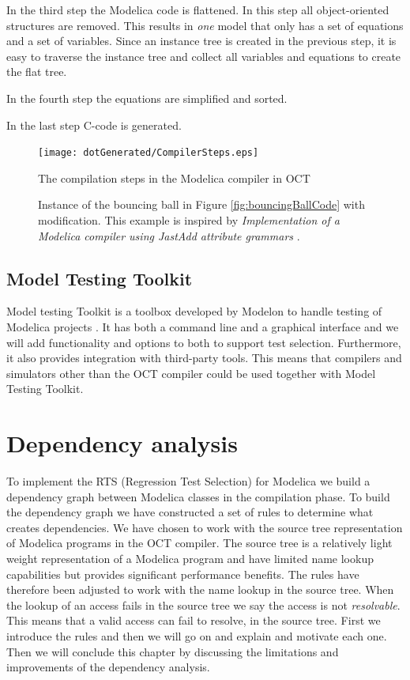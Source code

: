 \documentclass{cslthse-msc}
\begin{document}
In the third step the Modelica code is flattened. In this step all object-oriented structures are removed. This results in \emph{one} model that only has a set of equations and a set of variables. Since an instance tree is created in the previous step, it is easy to traverse the instance tree and collect all variables and equations to create the flat tree.

In the fourth step the equations are simplified and sorted.

In the last step C-code is generated. 

\begin{figure}[!htbp]
    \centering
    {\texttt{[image: dotGenerated/CompilerSteps.eps]}}
    \caption{The compilation steps in the Modelica compiler in OCT}
    \label{fig:compilerSteps}
\end{figure}

\begin{figure}[!htbp]
    \centering
    
    \caption{Instance of the bouncing ball in Figure \ref{fig:bouncingBallCode} with modification. This example is inspired by \textit{Implementation of a Modelica compiler using JastAdd attribute grammars} \cite{aakesson2010implementation}.}
    \label{fig:bouncingBallInstance}
\end{figure}

\section{Model Testing Toolkit}
Model testing Toolkit is a toolbox developed by Modelon to handle testing of Modelica projects \cite{modelon.comMTT}. It has both a command line and a graphical interface and we will add functionality and options to both to support test selection. Furthermore, it also provides integration with third-party tools. This means that compilers and simulators other than the OCT compiler could be used together with Model Testing Toolkit.


\chapter[Dependency analysis]{Dependency analysis}
To implement the RTS (Regression Test Selection) for Modelica we build a dependency graph between Modelica classes in the compilation phase. To build the dependency graph we have constructed a set of rules to determine what creates dependencies. We have chosen to work with the source tree representation of Modelica programs in the OCT compiler. The source tree is a relatively light weight representation of a Modelica program and have limited name lookup capabilities but provides significant performance benefits. The rules have therefore been adjusted to work with the name lookup in the source tree. When the lookup of an access fails in the source tree we say the access is not \emph{resolvable}. This means that a valid access can fail to resolve, in the source tree. First we introduce the rules and then we will go on and explain and motivate each one. Then we will conclude this chapter by discussing the limitations and improvements of the dependency analysis.
\end{document}
